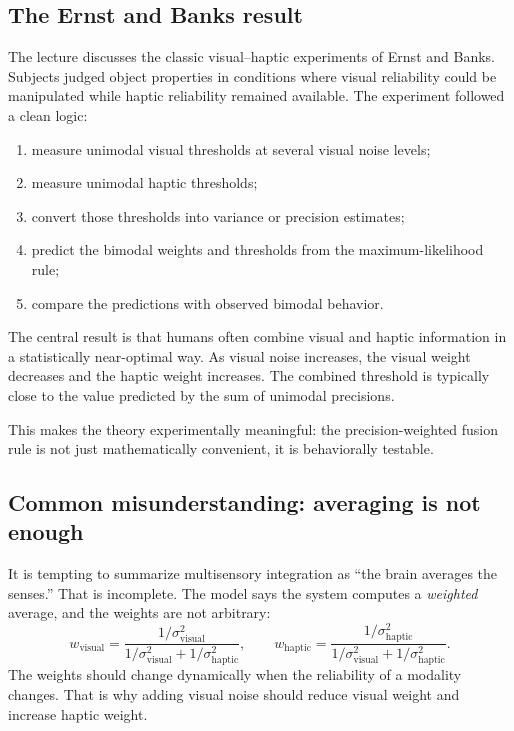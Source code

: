 \subsection{The Ernst and Banks result}

The lecture discusses the classic visual--haptic experiments of Ernst and Banks. Subjects judged object properties in conditions where visual reliability could be manipulated while haptic reliability remained available. The experiment followed a clean logic:
\begin{enumerate}
    \item measure unimodal visual thresholds at several visual noise levels;
    \item measure unimodal haptic thresholds;
    \item convert those thresholds into variance or precision estimates;
    \item predict the bimodal weights and thresholds from the maximum-likelihood rule;
    \item compare the predictions with observed bimodal behavior.
\end{enumerate}

The central result is that humans often combine visual and haptic information in a statistically near-optimal way. As visual noise increases, the visual weight decreases and the haptic weight increases. The combined threshold is typically close to the value predicted by the sum of unimodal precisions.

This makes the theory experimentally meaningful: the precision-weighted fusion rule is not just mathematically convenient, it is behaviorally testable.

\subsection{Common misunderstanding: averaging is not enough}

It is tempting to summarize multisensory integration as ``the brain averages the senses.'' That is incomplete. The model says the system computes a \emph{weighted} average, and the weights are not arbitrary:
\[
w_{\mathrm{visual}}
=
\frac{1/\sigma_{\mathrm{visual}}^2}
{1/\sigma_{\mathrm{visual}}^2+1/\sigma_{\mathrm{haptic}}^2},
\qquad
w_{\mathrm{haptic}}
=
\frac{1/\sigma_{\mathrm{haptic}}^2}
{1/\sigma_{\mathrm{visual}}^2+1/\sigma_{\mathrm{haptic}}^2}.
\]
The weights should change dynamically when the reliability of a modality changes. That is why adding visual noise should reduce visual weight and increase haptic weight.

